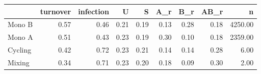 \begin{tabular}{lrrrrrrrr}
\toprule
 & turnover & infection & U & S & A\_r & B\_r & AB\_r & n \\
\midrule
Mono B & 0.57 & 0.46 & 0.21 & 0.19 & 0.13 & 0.28 & 0.18 & 4250.00 \\
Mono A & 0.51 & 0.43 & 0.23 & 0.19 & 0.30 & 0.10 & 0.18 & 2359.00 \\
Cycling & 0.42 & 0.72 & 0.23 & 0.21 & 0.14 & 0.14 & 0.28 & 6.00 \\
Mixing & 0.34 & 0.71 & 0.23 & 0.20 & 0.18 & 0.09 & 0.30 & 2.00 \\
\bottomrule
\end{tabular}

